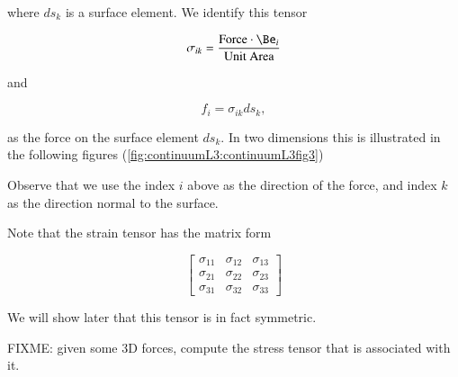 where $ds_k$ is a surface element.  We identify this tensor

\begin{equation}\label{eqn:continuumL3:310}
\sigma_{ik} = \frac{\text{Force} \cdot \Be_i}{\text{Unit Area}}
\end{equation}

and 

\begin{equation}\label{eqn:continuumL3:330}
f_i = \sigma_{ik} ds_k,
\end{equation}

as the force on the surface element $ds_k$.  In two dimensions this is illustrated in the following figures (\ref{fig:continuumL3:continuumL3fig3})

Observe that we use the index $i$ above as the direction of the force, and index $k$ as the direction normal to the surface.

Note that the strain tensor has the matrix form

\begin{equation}\label{eqn:continuumL3:350}
\begin{bmatrix}
\sigma_{11} & \sigma_{12} & \sigma_{13} \\
\sigma_{21} & \sigma_{22} & \sigma_{23} \\
\sigma_{31} & \sigma_{32} & \sigma_{33}
\end{bmatrix}
\end{equation}

We will show later that this tensor is in fact symmetric.

FIXME: given some 3D forces, compute the stress tensor that is associated with it.

